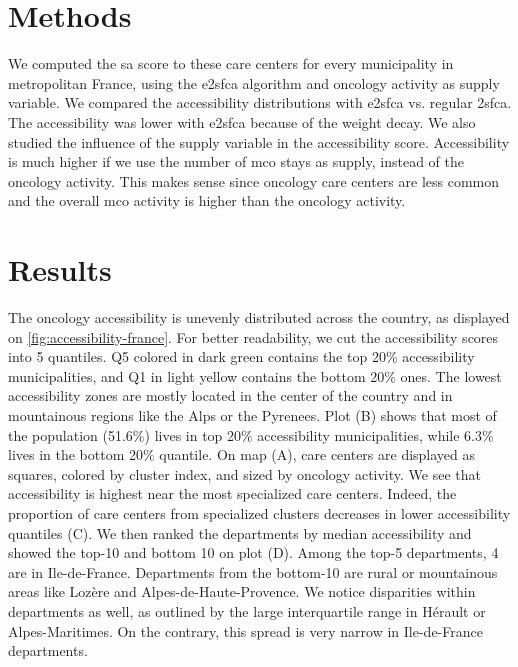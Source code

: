 \section{Methods}

We computed the \ac{sa} score to these care centers for every municipality in
metropolitan France, using the \ac{e2sfca} algorithm and oncology activity as
supply variable. We compared the accessibility distributions with \ac{e2sfca}
vs. regular \ac{2sfca}. The accessibility was lower with \ac{e2sfca} because of
the weight decay. We also studied the influence of the supply variable in the
accessibility score. Accessibility is much higher if we use the number of
\ac{mco} stays as supply, instead of the oncology activity. This makes sense
since oncology care centers are less common and the overall \ac{mco} activity is
higher than the oncology activity.

\section{Results}

The oncology accessibility is unevenly distributed across the country, as
displayed on \cref{fig:accessibility-france}. For better readability, we cut the
accessibility scores into 5 quantiles. Q5 colored in dark green contains the top
20\% accessibility municipalities, and Q1 in light yellow contains the bottom
20\% ones. The lowest accessibility zones are mostly located in the center of
the country and in mountainous regions like the Alps or the Pyrenees. Plot (B)
shows that most of the population (51.6\%) lives in top 20\% accessibility
municipalities, while 6.3\% lives in the bottom 20\% quantile. On map (A), care
centers are displayed as squares, colored by cluster index, and sized by
oncology activity. We see that accessibility is highest near the most
specialized care centers. Indeed, the proportion of care centers from
specialized clusters decreases in lower accessibility quantiles (C). We then
ranked the departments by median accessibility and showed the top-10 and bottom
10 on plot (D). Among the top-5 departments, 4 are in Ile-de-France. Departments
from the bottom-10 are rural or mountainous areas like Lozère and
Alpes-de-Haute-Provence.  We notice disparities within departments as well, as
outlined by the large interquartile range in Hérault or Alpes-Maritimes. On the
contrary, this spread is very narrow in Ile-de-France departments.

